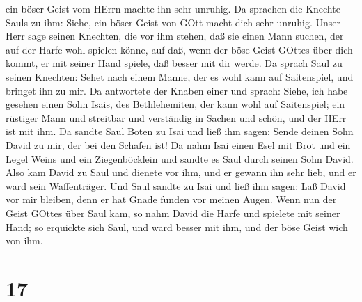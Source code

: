 ein böser Geist vom HErrn machte ihn sehr unruhig.  Da
sprachen die Knechte Sauls zu ihm: Siehe, ein böser Geist von GOtt macht
dich sehr unruhig.  Unser Herr sage seinen Knechten, die
vor ihm stehen, daß sie einen Mann suchen, der auf der Harfe wohl
spielen könne, auf daß, wenn der böse Geist GOttes über dich kommt, er
mit seiner Hand spiele, daß besser mit dir werde.  Da
sprach Saul zu seinen Knechten: Sehet nach einem Manne, der es wohl kann
auf Saitenspiel, und bringet ihn zu mir.  Da antwortete der
Knaben einer und sprach: Siehe, ich habe gesehen einen Sohn Isais, des
Bethlehemiten, der kann wohl auf Saitenspiel; ein rüstiger Mann und
streitbar und verständig in Sachen und schön, und der HErr ist mit ihm.
 Da sandte Saul Boten zu Isai und ließ ihm sagen: Sende
deinen Sohn David zu mir, der bei den Schafen ist!  Da nahm
Isai einen Esel mit Brot und ein Legel Weins und ein Ziegenböcklein und
sandte es Saul durch seinen Sohn David.  Also kam David zu
Saul und dienete vor ihm, und er gewann ihn sehr lieb, und er ward sein
Waffenträger.  Und Saul sandte zu Isai und ließ ihm sagen:
Laß David vor mir bleiben, denn er hat Gnade funden vor meinen Augen.
 Wenn nun der Geist GOttes über Saul kam, so nahm David die
Harfe und spielete mit seiner Hand; so erquickte sich Saul, und ward
besser mit ihm, und der böse Geist wich von ihm.

\hypertarget{section-16}{%
\section{17}\label{section-16}}

